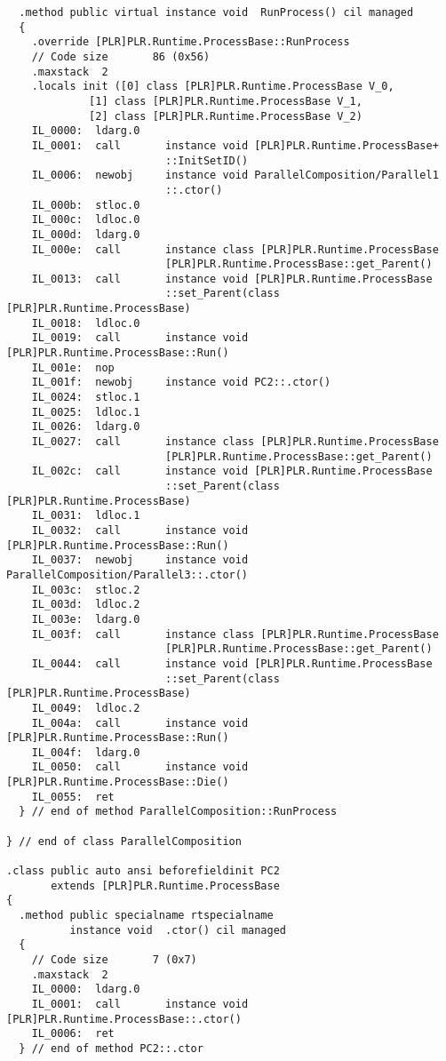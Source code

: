 \begin{lstlisting}
  .method public virtual instance void  RunProcess() cil managed
  {
    .override [PLR]PLR.Runtime.ProcessBase::RunProcess
    // Code size       86 (0x56)
    .maxstack  2
    .locals init ([0] class [PLR]PLR.Runtime.ProcessBase V_0,
             [1] class [PLR]PLR.Runtime.ProcessBase V_1,
             [2] class [PLR]PLR.Runtime.ProcessBase V_2)
    IL_0000:  ldarg.0
    IL_0001:  call       instance void [PLR]PLR.Runtime.ProcessBase+
                         ::InitSetID()
    IL_0006:  newobj     instance void ParallelComposition/Parallel1
                         ::.ctor()
    IL_000b:  stloc.0
    IL_000c:  ldloc.0
    IL_000d:  ldarg.0
    IL_000e:  call       instance class [PLR]PLR.Runtime.ProcessBase 
                         [PLR]PLR.Runtime.ProcessBase::get_Parent()
    IL_0013:  call       instance void [PLR]PLR.Runtime.ProcessBase
                         ::set_Parent(class [PLR]PLR.Runtime.ProcessBase)
    IL_0018:  ldloc.0
    IL_0019:  call       instance void [PLR]PLR.Runtime.ProcessBase::Run()
    IL_001e:  nop
    IL_001f:  newobj     instance void PC2::.ctor()
    IL_0024:  stloc.1
    IL_0025:  ldloc.1
    IL_0026:  ldarg.0
    IL_0027:  call       instance class [PLR]PLR.Runtime.ProcessBase 
                         [PLR]PLR.Runtime.ProcessBase::get_Parent()
    IL_002c:  call       instance void [PLR]PLR.Runtime.ProcessBase
                         ::set_Parent(class [PLR]PLR.Runtime.ProcessBase)
    IL_0031:  ldloc.1
    IL_0032:  call       instance void [PLR]PLR.Runtime.ProcessBase::Run()
    IL_0037:  newobj     instance void ParallelComposition/Parallel3::.ctor()
    IL_003c:  stloc.2
    IL_003d:  ldloc.2
    IL_003e:  ldarg.0
    IL_003f:  call       instance class [PLR]PLR.Runtime.ProcessBase 
                         [PLR]PLR.Runtime.ProcessBase::get_Parent()
    IL_0044:  call       instance void [PLR]PLR.Runtime.ProcessBase
                         ::set_Parent(class [PLR]PLR.Runtime.ProcessBase)
    IL_0049:  ldloc.2
    IL_004a:  call       instance void [PLR]PLR.Runtime.ProcessBase::Run()
    IL_004f:  ldarg.0
    IL_0050:  call       instance void [PLR]PLR.Runtime.ProcessBase::Die()
    IL_0055:  ret
  } // end of method ParallelComposition::RunProcess

} // end of class ParallelComposition

.class public auto ansi beforefieldinit PC2
       extends [PLR]PLR.Runtime.ProcessBase
{
  .method public specialname rtspecialname 
          instance void  .ctor() cil managed
  {
    // Code size       7 (0x7)
    .maxstack  2
    IL_0000:  ldarg.0
    IL_0001:  call       instance void [PLR]PLR.Runtime.ProcessBase::.ctor()
    IL_0006:  ret
  } // end of method PC2::.ctor


\end{lstlisting}
